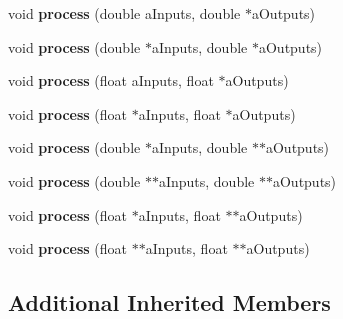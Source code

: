 \begin{DoxyCompactItemize}
\item 
\hypertarget{class_ambisonics_grain_ac99c81926eb72bbb89a8c8c0f559e28b}{void {\bfseries process} (double a\-Inputs, double $\ast$a\-Outputs)}\label{class_ambisonics_grain_ac99c81926eb72bbb89a8c8c0f559e28b}

\item 
\hypertarget{class_ambisonics_grain_abd3ccadf4f960bae1b8fad30982d62de}{void {\bfseries process} (double $\ast$a\-Inputs, double $\ast$a\-Outputs)}\label{class_ambisonics_grain_abd3ccadf4f960bae1b8fad30982d62de}

\item 
\hypertarget{class_ambisonics_grain_a07001768d1de8c9b5b2d9187933173ec}{void {\bfseries process} (float a\-Inputs, float $\ast$a\-Outputs)}\label{class_ambisonics_grain_a07001768d1de8c9b5b2d9187933173ec}

\item 
\hypertarget{class_ambisonics_grain_a51fdb2959df1ca5afe33af1c727c01e9}{void {\bfseries process} (float $\ast$a\-Inputs, float $\ast$a\-Outputs)}\label{class_ambisonics_grain_a51fdb2959df1ca5afe33af1c727c01e9}

\item 
\hypertarget{class_ambisonics_grain_aa92088e27c20b17f55db92b6713514ea}{void {\bfseries process} (double $\ast$a\-Inputs, double $\ast$$\ast$a\-Outputs)}\label{class_ambisonics_grain_aa92088e27c20b17f55db92b6713514ea}

\item 
\hypertarget{class_ambisonics_grain_abc6b99da7f3dca9f985ac617c9cedd0d}{void {\bfseries process} (double $\ast$$\ast$a\-Inputs, double $\ast$$\ast$a\-Outputs)}\label{class_ambisonics_grain_abc6b99da7f3dca9f985ac617c9cedd0d}

\item 
\hypertarget{class_ambisonics_grain_a050a9e13e16d1bf6a66cc6dcbb6b2a85}{void {\bfseries process} (float $\ast$a\-Inputs, float $\ast$$\ast$a\-Outputs)}\label{class_ambisonics_grain_a050a9e13e16d1bf6a66cc6dcbb6b2a85}

\item 
\hypertarget{class_ambisonics_grain_a54e4e39a6c65c5745b430a4c04cb033f}{void {\bfseries process} (float $\ast$$\ast$a\-Inputs, float $\ast$$\ast$a\-Outputs)}\label{class_ambisonics_grain_a54e4e39a6c65c5745b430a4c04cb033f}

\end{DoxyCompactItemize}
\subsection*{Additional Inherited Members}



